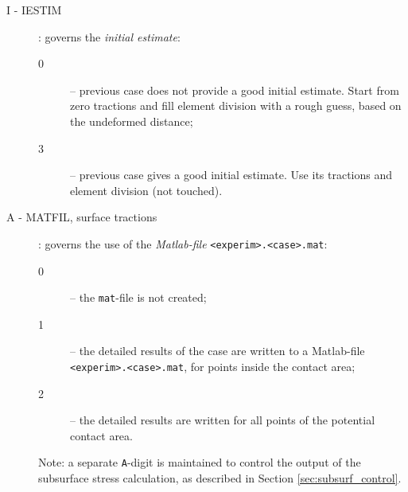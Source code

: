 \documentclass[12pt]{report}
\renewcommand{\magenta}[1]{}
\begin{document}
\begin{description}
\item[I - IESTIM] \label{i-digit} : governs the {\em initial estimate\/}:
\begin{description}
\item[0] -- previous case does not provide a good initial estimate. Start
        from zero tractions and fill element division with a rough guess,
        based on the undeformed distance;
\magenta{
\item[1] -- use previous solution, regularize tractions. The element
        division of the previous case is used as initial estimate, and the
        tractions are adjusted to this state;
\item[2] -- use normal part of previous case only. The normal tractions are
        maintained, but all elements start with zero tangential tractions,
        in the adhesion area;
}
\item[3] -- previous case gives a good initial estimate. Use its tractions
        and element division (not touched).
\end{description}

\item[A - MATFIL, surface tractions] \label{a-digit} : governs the use of
        the {\em Matlab-file\/} {\tt <experim>.\-<case>\-.mat}:
\begin{description}
\magenta{
\item[$\mathbf{-2}$] -- detailed results are computed for all points of the
        potential contact area, the {\tt mat}-file is not created;
\item[$\mathbf{-1}$] -- detailed results are computed for elements inside
        the contact area, the {\tt mat}-file is not created;
}
\item[0] -- the {\tt mat}-file is not created;
\item[1] -- the detailed results of the case are written to a Matlab-file
        {\tt <experim>.<case>.mat}, for points inside the contact area;
\item[2] -- the detailed results are written for all points of the potential
        contact area.
\end{description}
\magenta{Options ${\tt A}=-2, -1$ are provided for the CONTACT library
version.}
Note: a separate {\tt A}-digit is maintained to control the output
of the subsurface stress calculation, as described in Section
\ref{sec:subsurf_control}.


\end{description}
\end{document}
